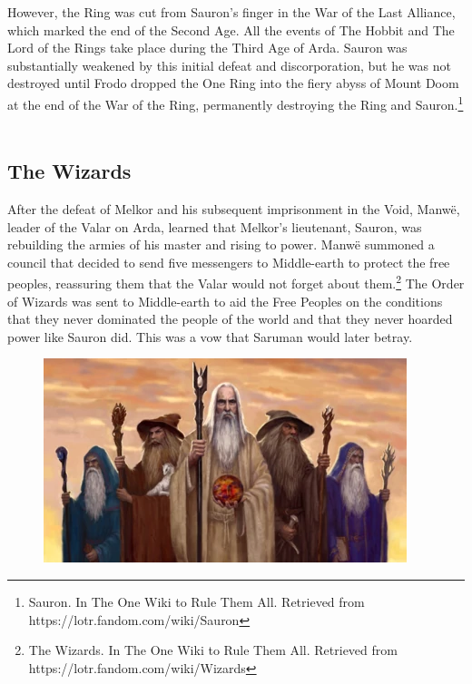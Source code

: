 \documentclass[10pt, letterpaper]{article}
\begin{document}
\noindent \newline However, the Ring was cut from Sauron’s finger in the War of the Last Alliance, which marked the end of the Second Age. All the events of The Hobbit and The Lord of the Rings take place during the Third Age of Arda. Sauron was substantially weakened by this initial defeat and discorporation, but he was not destroyed until Frodo dropped the One Ring into the fiery abyss of Mount Doom at the end of the War of the Ring, permanently destroying the Ring and Sauron.\footnote{Sauron. In The One Wiki to Rule Them All. Retrieved from https://lotr.fandom.com/wiki/Sauron } \\ \\

\subsection{The Wizards}

After the defeat of Melkor and his subsequent imprisonment in the Void, Manwë, leader of the Valar on Arda, learned that Melkor’s lieutenant, Sauron, was rebuilding the armies of his master and rising to power. Manwë summoned a council that decided to send five messengers to Middle-earth to protect the free peoples, reassuring them that the Valar would not forget about them.\footnote{The Wizards. In The One Wiki to Rule Them All. Retrieved from  https://lotr.fandom.com/wiki/Wizards} The Order of Wizards was sent to Middle-earth to aid the Free Peoples on the conditions that they never dominated the people of the world and that they never hoarded power like Sauron did. This was a vow that Saruman would later betray. \\

  \begin{figure}
        \centering
        \includegraphics[scale = 0.5]{image4.png}
    \end{figure}
    
\end{document}
